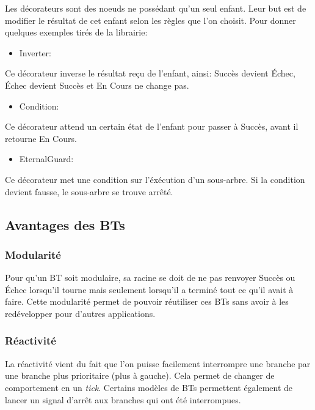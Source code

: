 \documentclass[11pt]{article}
\begin{document}
\begin{enumerate}
Les décorateurs sont des noeuds ne possédant qu'un seul enfant. Leur but est de modifier le résultat de cet enfant selon les règles que l'on choisit.
Pour donner quelques exemples tirés de la librairie:

\begin{itemize}
\item Inverter:
\end{itemize}

Ce décorateur inverse le résultat reçu de l'enfant, ainsi: Succès devient Échec, Échec devient Succès et En Cours ne change pas.

\begin{itemize}
\item Condition:
\end{itemize}

Ce décorateur attend un certain état de l'enfant pour passer à Succès, avant il retourne En Cours. 

\begin{itemize}
\item EternalGuard:
\end{itemize}

Ce décorateur met une condition sur l'éxécution d'un sous-arbre. Si la condition devient fausse, le sous-arbre se trouve arrêté.



\clearpage
\end{enumerate}
\subsection{Avantages des BTs}
\label{sec-2-2}
\subsubsection{Modularité}
\label{sec-2-2-1}
Pour qu'un BT soit modulaire, sa racine se doit de ne pas renvoyer Succès ou Échec lorsqu'il tourne mais seulement lorsqu'il a terminé tout ce qu'il avait à faire.
Cette modularité permet de pouvoir réutiliser ces BTs sans avoir à les redévelopper pour d'autres applications.

\subsubsection{Réactivité}
\label{sec-2-2-2}
La réactivité vient du fait que l'on puisse facilement interrompre une branche par une branche plus prioritaire (plus à gauche).
Cela permet de changer de comportement en un \emph{tick}.
Certains modèles de BTs permettent également de lancer un signal d'arrêt aux branches qui ont été interrompues.
\end{document}
